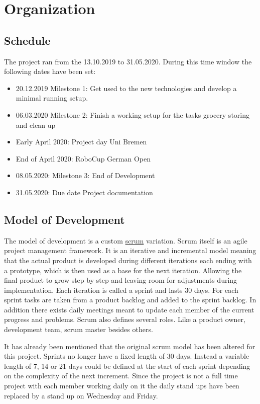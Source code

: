 \documentclass[main.tex]{subfiles}
\begin{document}
	\chapter{Organization}
	\label{organisation}
	
	\section{Schedule}
	The project ran from the 13.10.2019 to 31.05.2020. During this time window the following dates have been set:
	\begin{itemize}
		\item 20.12.2019 Milestone 1: Get used to the new technologies and develop a minimal running setup.
		\item 06.03.2020 Milestone 2: Finish a working setup for the tasks grocery storing and clean up
		\item Early April 2020: Project day Uni Bremen
		\item End of April 2020: RoboCup German Open
		\item 08.05.2020: Milestone 3: End of Development
		\item 31.05.2020: Due date Project documentation
	\end{itemize} 

	\section{Model of Development}
	\label{sec:modelofdevelopment}
	The model of development is a custom \href{http://projektmanagement-definitionen.de/glossar/scrum/}{scrum} variation. Scrum itself is an agile project management framework. It is an iterative and incremental model meaning that the actual product is developed during different iterations each ending with a prototype, which is then used as a base for the next iteration. Allowing the final product to grow step by step and leaving room for adjustments during implementation. Each iteration is called a sprint and lasts 30 days. For each sprint tasks are taken from a product backlog and added to the sprint backlog. In addition there exists daily meetings meant to update each member of the current progress and problems. Scrum also defines several roles. Like a product owner, development team, scrum master besides others.  
	
	It has already been mentioned that the original scrum model has been altered for this project. Sprints no longer have a fixed length of 30 days. Instead a variable length of 7, 14 or 21 days could be defined at the start of each sprint depending on the complexity of the next increment. Since the project is not a full time project with each member working daily on it the daily stand ups have been replaced by a stand up on Wednesday and Friday. 
	
\end{document}
